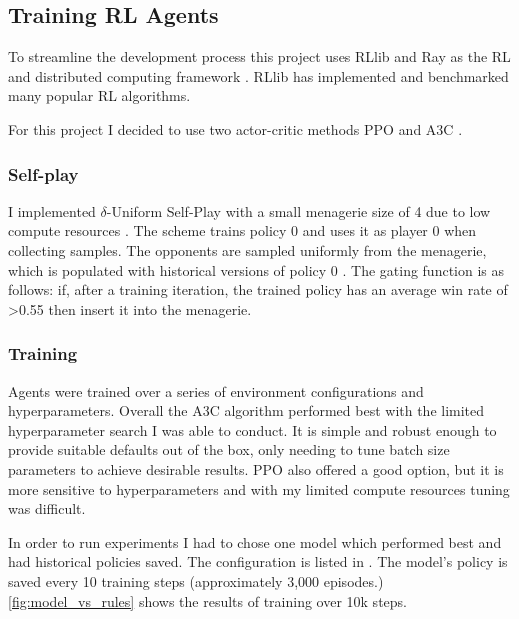 \documentclass[../main.tex]{subfiles}
\begin{document}
\subsection{Training RL Agents}
To streamline the development process this project uses RLlib and Ray as the RL and distributed computing framework \cite{liang_rllib_2018}. RLlib has implemented and benchmarked many popular RL algorithms.


For this project I decided to use two actor-critic methods PPO \cite{schulman_proximal_2017} and A3C \cite{mnih_asynchronous_2016}. 

\subsubsection{Self-play} \label{method:selfplay}

I implemented $\delta$-Uniform Self-Play with a small menagerie size of 4 due to low compute resources \cite{hernandez_comparison_2020}. The scheme trains policy 0 and uses it as player 0 when collecting samples. The opponents are sampled uniformly from the menagerie, which is populated with historical versions of policy 0 \cite{bansal_emergent_2018}. The gating function is as follows: if, after a training iteration, the trained policy has an average win rate of >0.55 then insert it into the menagerie. 


\subsubsection{Training}
Agents were trained over a series of environment configurations and hyperparameters. Overall the A3C algorithm performed best with the limited hyperparameter search I was able to conduct. It is simple and robust enough to provide suitable defaults out of the box, only needing to tune batch size parameters to achieve desirable results. PPO also offered a good option, but it is more sensitive to hyperparameters and with my limited compute resources tuning was difficult. 

In order to run experiments I had to chose one model which performed best and had historical policies saved. The configuration is listed in . The model's policy is saved every 10 training steps (approximately 3,000 episodes.) \autoref{fig:model_vs_rules} shows the results of training over 10k steps. 
\end{document}
